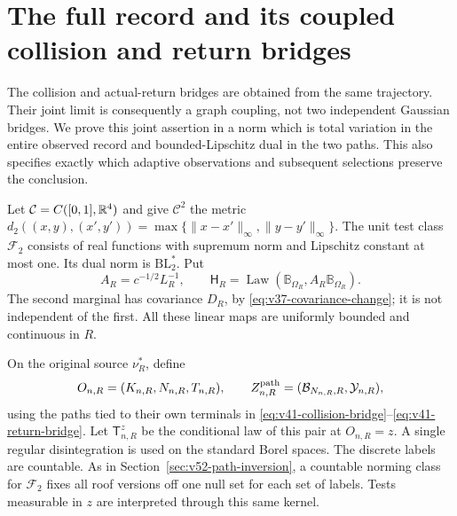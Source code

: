 \section{The full record and its coupled collision and return bridges}
\label{sec:v57-coupled-bridges}
The collision and actual-return bridges are obtained from the same
trajectory. Their joint limit is consequently a graph coupling, not
two independent Gaussian bridges. We prove this joint assertion in a
norm which is total variation in the entire observed record and
bounded-Lipschitz dual in the two paths. This also specifies exactly
which adaptive observations and subsequent selections preserve the
conclusion.

Let $\mathcal C=C([0,1],\mathbb R^4)$ and give $\mathcal C^2$ the metric
$d_2((x,y),(x',y'))=\max\{\|x-x'\|_\infty,\|y-y'\|_\infty\}$.
The unit test class $\mathcal F_2$ consists of real functions with
supremum norm and Lipschitz constant at most one. Its dual norm is
$\mathrm{BL}_2^*$. Put
\begin{equation}\label{eq:v57-bridge-graph}
 A_R=c^{-1/2}L_R^{-1},\qquad
 \mathsf H_R=\operatorname{Law}(\mathbb B_{\Omega_R},
                                      A_R\mathbb B_{\Omega_R}).
\end{equation}
The second marginal has covariance $D_R$, by
\eqref{eq:v37-covariance-change}; it is not independent of the first.
All these linear maps are uniformly bounded and continuous in $R$.

On the original source $\nu_R^*$, define
\[
 O_{n,R}=(K_{n,R},N_{n,R},T_{n,R}),\qquad
 Z_{n,R}^{\rm path}=(\mathcal B_{N_{n,R},R},\mathcal Y_{n,R}),
\]
using the paths tied to their own terminals in
\eqref{eq:v41-collision-bridge}--\eqref{eq:v41-return-bridge}.
Let $\mathsf T_{n,R}^z$ be the conditional law of this pair at
$O_{n,R}=z$. A single regular disintegration is used on the standard
Borel spaces. The discrete labels are countable. As in
Section~\ref{sec:v52-path-inversion}, a countable norming class for
$\mathcal F_2$ fixes all roof versions off one null set for each set of
labels. Tests measurable in $z$ are interpreted through this same kernel.

